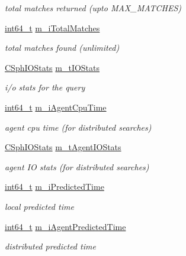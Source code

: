 \begin{DoxyCompactItemize}
\begin{DoxyCompactList}\small\item\em total matches returned (upto M\-A\-X\-\_\-\-M\-A\-T\-C\-H\-E\-S) \end{DoxyCompactList}\item 
\hyperlink{sphinxstd_8h_a996e72f71b11a5bb8b3b7b6936b1516d}{int64\-\_\-t} \hyperlink{classCSphQueryResultMeta_aa212bc7b1148d610d6aca616ddd14d4b}{m\-\_\-i\-Total\-Matches}
\begin{DoxyCompactList}\small\item\em total matches found (unlimited) \end{DoxyCompactList}\item 
\hyperlink{classCSphIOStats}{C\-Sph\-I\-O\-Stats} \hyperlink{classCSphQueryResultMeta_a59801b7386119d26d7bee1a8c3428036}{m\-\_\-t\-I\-O\-Stats}
\begin{DoxyCompactList}\small\item\em i/o stats for the query \end{DoxyCompactList}\item 
\hyperlink{sphinxstd_8h_a996e72f71b11a5bb8b3b7b6936b1516d}{int64\-\_\-t} \hyperlink{classCSphQueryResultMeta_a8333ab6fcf9a0b825e29d165fc1d6b22}{m\-\_\-i\-Agent\-Cpu\-Time}
\begin{DoxyCompactList}\small\item\em agent cpu time (for distributed searches) \end{DoxyCompactList}\item 
\hyperlink{classCSphIOStats}{C\-Sph\-I\-O\-Stats} \hyperlink{classCSphQueryResultMeta_a75b36f1d4101ee5c04eed34a84ac9e34}{m\-\_\-t\-Agent\-I\-O\-Stats}
\begin{DoxyCompactList}\small\item\em agent I\-O stats (for distributed searches) \end{DoxyCompactList}\item 
\hyperlink{sphinxstd_8h_a996e72f71b11a5bb8b3b7b6936b1516d}{int64\-\_\-t} \hyperlink{classCSphQueryResultMeta_acf3a3a1f20860124b5d6416ee8bc4a50}{m\-\_\-i\-Predicted\-Time}
\begin{DoxyCompactList}\small\item\em local predicted time \end{DoxyCompactList}\item 
\hyperlink{sphinxstd_8h_a996e72f71b11a5bb8b3b7b6936b1516d}{int64\-\_\-t} \hyperlink{classCSphQueryResultMeta_a744cec6632ca0aa9028b3b8d78989fff}{m\-\_\-i\-Agent\-Predicted\-Time}
\begin{DoxyCompactList}\small\item\em distributed predicted time \end{DoxyCompactList}\item 

\end{DoxyCompactItemize}
